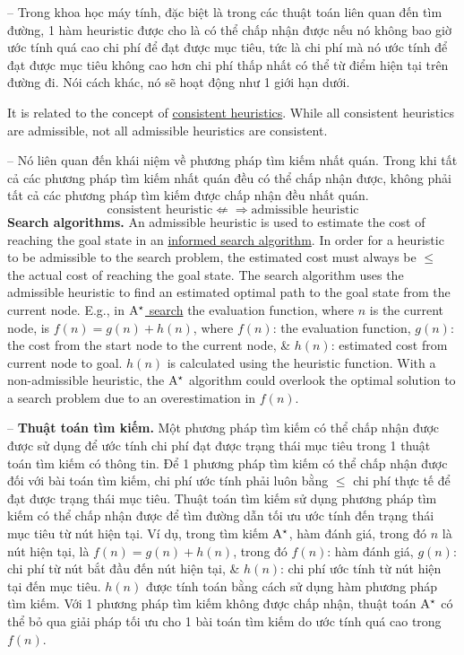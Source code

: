 \documentclass{article}
\begin{document}
-- Trong khoa học máy tính, đặc biệt là trong các thuật toán liên quan đến tìm đường, 1 hàm heuristic được cho là có thể chấp nhận được nếu nó không bao giờ ước tính quá cao chi phí để đạt được mục tiêu, tức là chi phí mà nó ước tính để đạt được mục tiêu không cao hơn chi phí thấp nhất có thể từ điểm hiện tại trên đường đi. Nói cách khác, nó sẽ hoạt động như 1 giới hạn dưới.

It is related to the concept of \href{https://en.wikipedia.org/wiki/Consistent_heuristic}{consistent heuristics}. While all consistent heuristics are admissible, not all admissible heuristics are consistent.

-- Nó liên quan đến khái niệm về phương pháp tìm kiếm nhất quán. Trong khi tất cả các phương pháp tìm kiếm nhất quán đều có thể chấp nhận được, không phải tất cả các phương pháp tìm kiếm được chấp nhận đều nhất quán.
\begin{equation*}
	\mbox{consistent heuristic}\not\Leftarrow\Rightarrow\mbox{admissible heuristic}
\end{equation*}
{\bf Search algorithms.} An admissible heuristic is used to estimate the cost of reaching the goal state in an \href{https://en.wikipedia.org/wiki/Informed_search_algorithm}{informed search algorithm}. In order for a heuristic to be admissible to the search problem, the estimated cost must always be $\le$ the actual cost of reaching the goal state. The search algorithm uses the admissible heuristic to find an estimated optimal path to the goal state from the current node. E.g., in \href{https://en.wikipedia.org/wiki/A*_search}{$\rm A^\star$ search} the evaluation function, where $n$ is the current node, is $f(n) = g(n) + h(n)$, where $f(n)$: the evaluation function, $g(n)$: the cost from the start node to the current node, \& $h(n)$: estimated cost from current node to goal. $h(n)$ is calculated using the heuristic function. With a non-admissible heuristic, the $\rm A^\star$ algorithm could overlook the optimal solution to a search problem due to an overestimation in $f(n)$.

-- {\bf Thuật toán tìm kiếm.} Một phương pháp tìm kiếm có thể chấp nhận được được sử dụng để ước tính chi phí đạt được trạng thái mục tiêu trong 1 thuật toán tìm kiếm có thông tin. Để 1 phương pháp tìm kiếm có thể chấp nhận được đối với bài toán tìm kiếm, chi phí ước tính phải luôn bằng $\le$ chi phí thực tế để đạt được trạng thái mục tiêu. Thuật toán tìm kiếm sử dụng phương pháp tìm kiếm có thể chấp nhận được để tìm đường dẫn tối ưu ước tính đến trạng thái mục tiêu từ nút hiện tại. Ví dụ, trong tìm kiếm $\rm A^\star$, hàm đánh giá, trong đó $n$ là nút hiện tại, là $f(n) = g(n) + h(n)$, trong đó $f(n)$: hàm đánh giá, $g(n)$: chi phí từ nút bắt đầu đến nút hiện tại, \& $h(n)$: chi phí ước tính từ nút hiện tại đến mục tiêu. $h(n)$ được tính toán bằng cách sử dụng hàm phương pháp tìm kiếm. Với 1 phương pháp tìm kiếm không được chấp nhận, thuật toán $\rm A^\star$ có thể bỏ qua giải pháp tối ưu cho 1 bài toán tìm kiếm do ước tính quá cao trong $f(n)$.
\end{document}
